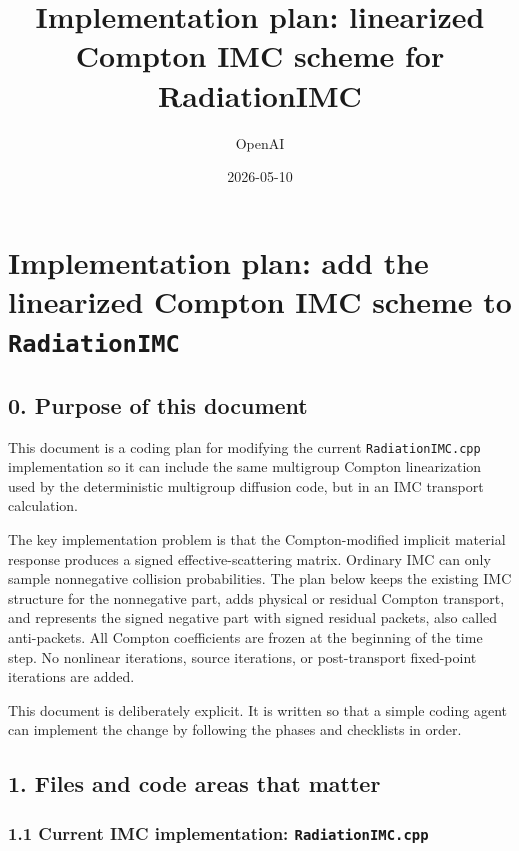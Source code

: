 \documentclass[
]{article}
\title{Implementation plan: linearized Compton IMC scheme for
RadiationIMC}
\author{OpenAI}
\date{2026-05-10}
\begin{document}
\maketitle

\section{\texorpdfstring{Implementation plan: add the linearized Compton
IMC scheme to
\texttt{RadiationIMC}}{Implementation plan: add the linearized Compton IMC scheme to RadiationIMC}}\label{implementation-plan-add-the-linearized-compton-imc-scheme-to-radiationimc}

\subsection{0. Purpose of this document}\label{purpose-of-this-document}

This document is a coding plan for modifying the current
\texttt{RadiationIMC.cpp} implementation so it can include the same
multigroup Compton linearization used by the deterministic multigroup
diffusion code, but in an IMC transport calculation.

The key implementation problem is that the Compton-modified implicit
material response produces a signed effective-scattering matrix.
Ordinary IMC can only sample nonnegative collision probabilities. The
plan below keeps the existing IMC structure for the nonnegative part,
adds physical or residual Compton transport, and represents the signed
negative part with signed residual packets, also called anti-packets.
All Compton coefficients are frozen at the beginning of the time step.
No nonlinear iterations, source iterations, or post-transport
fixed-point iterations are added.

This document is deliberately explicit. It is written so that a simple
coding agent can implement the change by following the phases and
checklists in order.

\subsection{1. Files and code areas that
matter}\label{files-and-code-areas-that-matter}

\subsubsection{\texorpdfstring{1.1 Current IMC implementation:
\texttt{RadiationIMC.cpp}}{1.1 Current IMC implementation: RadiationIMC.cpp}}\label{current-imc-implementation-radiationimc.cpp}
\end{document}
